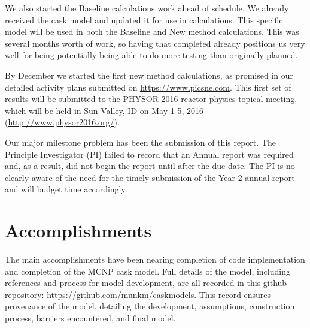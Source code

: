 \documentclass[12pt]{article}
\begin{document}
We also started the Baseline calculations work ahead of schedule. 
We already received the cask model and updated it for use in calculations. 
This specific model will be used in both the Baseline and New method calculations.  This was several months worth of work, so having that completed already positions us very well for being potentially being able to do more testing than originally planned. 

By December we started the first new method calculations, as promised in our detailed activity plans submitted on \href{https://www.picsne.com}{https://www.picsne.com}. 
This first set of results will be submitted to the PHYSOR 2016 reactor physics topical meeting, which will be held in Sun Valley, ID on May 1-5, 2016 \\(\href{http://www.physor2016.org/}{http://www.physor2016.org/}). 

Our major milestone problem has been the submission of this report. 
The Principle Investigator (PI) failed to record that an Annual report was required and, as a result, did not begin the report until after the due date. 
The PI is no clearly aware of the need for the timely submission of the Year 2 annual report and will budget time accordingly.


\section{Accomplishments}
\label{sect::accomplishments}

The main accomplishments have been nearing completion of code implementation and completion of the MCNP cask model. Full details of the model, including references and process for model development, are all recorded in this github repository: \href{https://github.com/munkm/caskmodels}{https://github.com/munkm/caskmodels}. This record ensures provenance of the model, detailing the development, assumptions, construction process, barriers encountered, and final model. 
\end{document}
